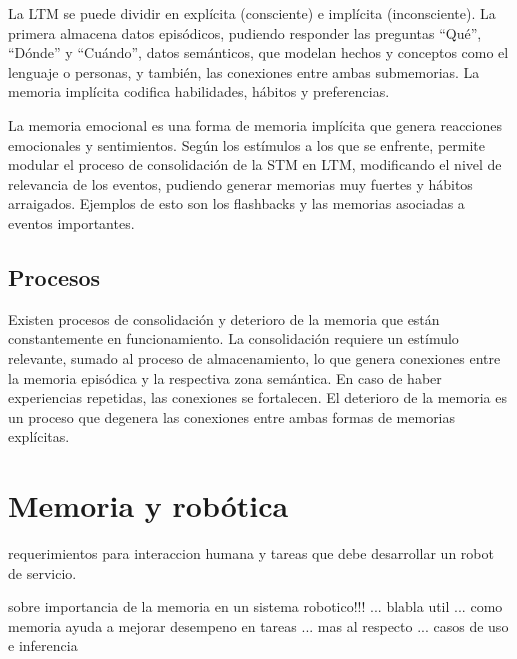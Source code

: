 La LTM se puede dividir en expl\'icita (consciente) e impl\'icita (inconsciente). La primera almacena datos epis\'odicos, pudiendo responder las preguntas ``Qu\'e'', ``D\'onde'' y ``Cu\'ando'', datos sem\'anticos, que modelan hechos y conceptos como el lenguaje o personas, y tambi\'en, las conexiones entre ambas submemorias. La memoria impl\'icita codifica habilidades, h\'abitos y preferencias.



La memoria emocional es una forma de memoria impl\'icita que genera reacciones emocionales y sentimientos. Seg\'un los est\'imulos a los que se enfrente, permite modular el proceso de consolidaci\'on de la STM en LTM, modificando el nivel de relevancia de los eventos, pudiendo generar memorias muy fuertes y h\'abitos arraigados. Ejemplos de esto son los flashbacks y las memorias asociadas a eventos importantes.


\subsection{Procesos}

Existen procesos de consolidaci\'on y deterioro de la memoria que est\'an constantemente en funcionamiento. La consolidaci\'on requiere un est\'imulo relevante, sumado al proceso de almacenamiento, lo que genera conexiones entre la memoria epis\'odica y la respectiva zona sem\'antica. En caso de haber experiencias repetidas, las conexiones se fortalecen. El deterioro de la memoria es un proceso que degenera las conexiones entre ambas formas de memorias expl\'icitas.





\section{Memoria y rob\'otica}

requerimientos para interaccion humana y tareas que debe desarrollar un robot de servicio.
%

sobre importancia de la memoria en un sistema robotico!!!
... blabla util \cite{Vijayakumar2014}
... como memoria ayuda a mejorar desempeno en tareas \cite{Salgado2012}
... mas al respecto \cite{Ho2009}
... casos de uso e inferencia \cite{Vijayakumar2014}


